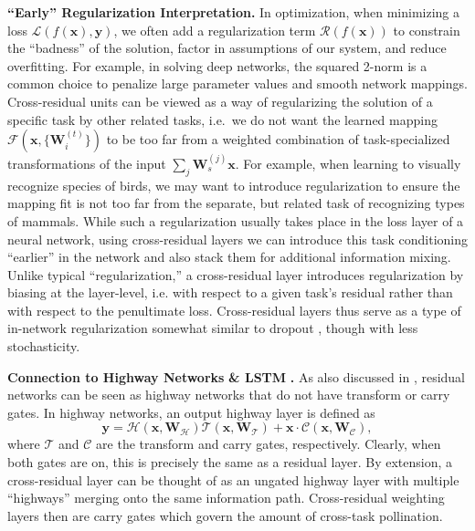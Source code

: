 \documentclass{sig-alternate-05-2015}
\newcommand{\mb}{\mathbf}
\begin{document}
\vspace{1.6mm}
\noindent \textbf{``Early'' Regularization Interpretation.}
In optimization, when minimizing a loss $\mathcal{L}(f(\mb x), \mb y)$, we often add a regularization term $\mathcal{R}(f(\mb x))$ to constrain the ``badness'' of the solution, factor in assumptions of our system, and reduce overfitting.
For example, in solving deep networks, the squared 2-norm is a common choice to penalize large parameter values and smooth network mappings.
Cross-residual units can be viewed as a way of regularizing the solution of a specific task by other related tasks, i.e.~we do not want the learned mapping $\mathcal{F}(\mb x, \{\mb W_i^{(t)}\})$ to be too far from a weighted combination of task-specialized transformations of the input $\sum_j \mb W_s^{(j)}\mb x$.
For example, when learning to visually recognize species of birds, we may want to introduce regularization to ensure the mapping fit is not too far from the separate, but related task of recognizing types of mammals.
While such a regularization usually takes place in the loss layer of a neural network, using cross-residual layers we can introduce this task conditioning ``earlier'' in the network and also stack them for additional information mixing.
Unlike typical ``regularization,'' a cross-residual layer introduces regularization by biasing at the layer-level, i.e. with respect to a given task’s residual rather than with respect to the penultimate loss.
Cross-residual layers thus serve as a type of in-network regularization somewhat similar to dropout \cite{srivastava_2014}, though with less stochasticity.

\vspace{1.6mm}
\noindent \textbf{Connection to Highway Networks} \cite{srivastava_2015} \textbf{ \& LSTM } \cite{hochreiter_1997}\textbf{.}
As also discussed in \cite{he_2016}, residual networks can be seen as highway networks \cite{srivastava_2015} that do not have transform or carry gates.
In highway networks, an output highway layer is defined as
\begin{equation}
  \mb y = \mathcal{H}(\mb x, \mb W_\mathcal{H}) \mathcal{T}(\mb x, \mb W_\mathcal{T}) + \mb x \cdot \mathcal{C}(\mb x, \mb W_\mathcal{C}),
  \label{eq:highway}
\end{equation}
where $\mathcal{T}$ and $\mathcal{C}$ are the transform and carry gates, respectively.
Clearly, when both gates are on, this is precisely the same as a residual layer.
By extension, a cross-residual layer can be thought of as an ungated highway layer with multiple ``highways'' merging onto the same information path.
Cross-residual weighting layers then are carry gates which govern the amount of cross-task pollination.
\end{document}
